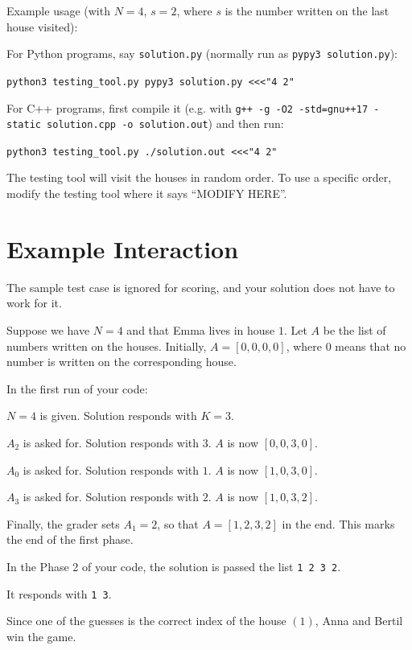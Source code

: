 Example usage (with $N=4$, $s=2$, where $s$ is the number written on the last house visited):

For Python programs, say \verb|solution.py| (normally run as \verb|pypy3 solution.py|):

    \verb|python3 testing_tool.py pypy3 solution.py <<<"4 2"|

For C++ programs, first compile it
(e.g. with \verb|g++ -g -O2 -std=gnu++17 -static solution.cpp -o solution.out|)
and then run:

    \verb|python3 testing_tool.py ./solution.out <<<"4 2"|

The testing tool will visit the houses in random order.
To use a specific order, modify the testing tool where it says ``MODIFY HERE''.

\section*{Example Interaction}

The sample test case is ignored for scoring, and your solution does not have to work for it.

Suppose we have $N = 4$ and that Emma lives in house $1$. 
Let $A$ be the list of numbers written on the houses.
Initially, $A = [0, 0, 0, 0]$, where $0$ means that no number is written on the corresponding house.

In the first run of your code:

$N = 4$ is given. Solution responds with $K = 3$.

$A_2$ is asked for. Solution responds with $3$. $A$ is now $[0, 0, 3, 0]$.

$A_0$ is asked for. Solution responds with $1$. $A$ is now $[1, 0, 3, 0]$.

$A_3$ is asked for. Solution responds with $2$. $A$ is now $[1, 0, 3, 2]$.

Finally, the grader sets $A_1 = 2$, so that $A = [1, 2, 3, 2]$ in the end.
This marks the end of the first phase.

In the Phase 2 of your code, the solution is passed the list \texttt{1 2 3 2}.

It responds with \texttt{1 3}.

Since one of the guesses is the correct index of the house $(1)$, Anna and Bertil win the game.
